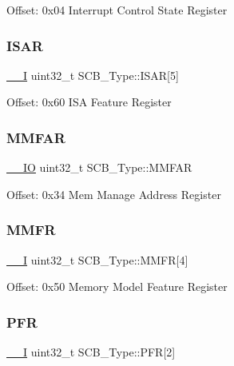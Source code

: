 Offset\+: 0x04 Interrupt Control State Register ~\newline
 \mbox{\label{struct_s_c_b___type_acee8e458f054aac964268f4fe647ea4f}} 
\subsubsection{\texorpdfstring{ISAR}{ISAR}}
{\footnotesize\ttfamily \mbox{\hyperlink{group___c_m_s_i_s___c_m3__core__definitions_gaf63697ed9952cc71e1225efe205f6cd3}{\+\_\+\+\_\+I}} uint32\+\_\+t S\+C\+B\+\_\+\+Type\+::\+I\+S\+AR\mbox{[}5\mbox{]}}

Offset\+: 0x60 I\+SA Feature Register ~\newline
 \mbox{\label{struct_s_c_b___type_ac49b24b3f222508464f111772f2c44dd}} 
\subsubsection{\texorpdfstring{MMFAR}{MMFAR}}
{\footnotesize\ttfamily \mbox{\hyperlink{group___c_m_s_i_s___c_m3__core__definitions_gaec43007d9998a0a0e01faede4133d6be}{\+\_\+\+\_\+\+IO}} uint32\+\_\+t S\+C\+B\+\_\+\+Type\+::\+M\+M\+F\+AR}

Offset\+: 0x34 Mem Manage Address Register ~\newline
 \mbox{\label{struct_s_c_b___type_aec2f8283d2737c6897188568a4214976}} 
\subsubsection{\texorpdfstring{MMFR}{MMFR}}
{\footnotesize\ttfamily \mbox{\hyperlink{group___c_m_s_i_s___c_m3__core__definitions_gaf63697ed9952cc71e1225efe205f6cd3}{\+\_\+\+\_\+I}} uint32\+\_\+t S\+C\+B\+\_\+\+Type\+::\+M\+M\+FR\mbox{[}4\mbox{]}}

Offset\+: 0x50 Memory Model Feature Register ~\newline
 \mbox{\label{struct_s_c_b___type_a3f51c43f952f3799951d0c54e76b0cb7}} 
\subsubsection{\texorpdfstring{PFR}{PFR}}
{\footnotesize\ttfamily \mbox{\hyperlink{group___c_m_s_i_s___c_m3__core__definitions_gaf63697ed9952cc71e1225efe205f6cd3}{\+\_\+\+\_\+I}} uint32\+\_\+t S\+C\+B\+\_\+\+Type\+::\+P\+FR\mbox{[}2\mbox{]}}

